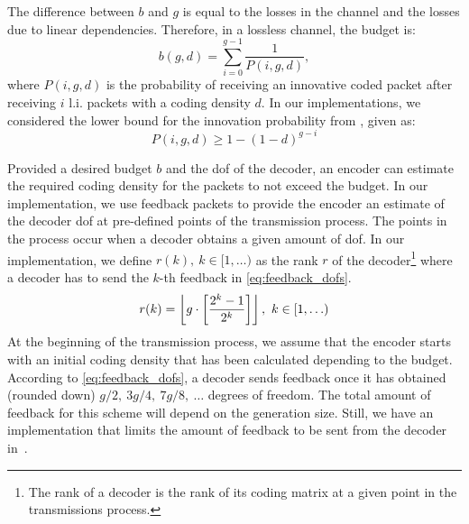 The difference between $b$ and $g$ is equal to the losses in the channel
and the losses due to linear dependencies. Therefore, in a lossless
channel, the budget is:
\begin{equation}\label{eq:budget}
    b(g,d)=\sum^{g-1}_{i=0}\frac{1}{P(i,g,d)},
\end{equation}
where $P(i,g,d)$ is the probability of receiving an innovative coded packet
after receiving $i$ \ac{l.i.} packets with a coding density $d$. In our
implementations, we considered the lower bound for the innovation probability
from \cite{feizi2014tunable}, given as:
\begin{equation}
    P(i,g,d) \geq 1-(1-d)^{g-i}
\end{equation}

Provided a desired budget $b$ and the \ac{dof} of the decoder, an encoder
can estimate the required coding density for the packets to not exceed the
budget. In our implementation, we use feedback packets to provide the
encoder an estimate of the decoder \ac{dof} at pre-defined points of the
transmission process. The points in the process occur when a decoder
obtains a given amount of \ac{dof}. In our implementation, we define $r(k),\
k \in [1, \ldots)$ as the rank $r$ of the decoder\footnote{The rank of
a decoder is the rank of its coding matrix at a given point in the
transmissions process.} where a decoder has to send the $k$-th feedback in
\eqref{eq:feedback_dofs}.
%
\begin{equation}\label{eq:feedback_dofs}
    r(k) = \left\lfloor g\cdot \left[\frac{2^k -1}{2^k}\right]\right\rfloor,\ k \in [1,\ldots)
\end{equation}
%
At the beginning of the transmission process, we assume that the encoder
starts with an initial coding density that has been calculated depending to
the budget. According to \eqref{eq:feedback_dofs}, a decoder sends feedback
once it has obtained (rounded down) $g/2,\ 3g/4,\ 7g/8,\ \ldots$  degrees of
freedom. The total amount of feedback for this scheme will depend on the
generation size. Still, we have an implementation that limits the amount of
feedback to be sent from the decoder in~\cite{practicalview_tsnc2015}.

